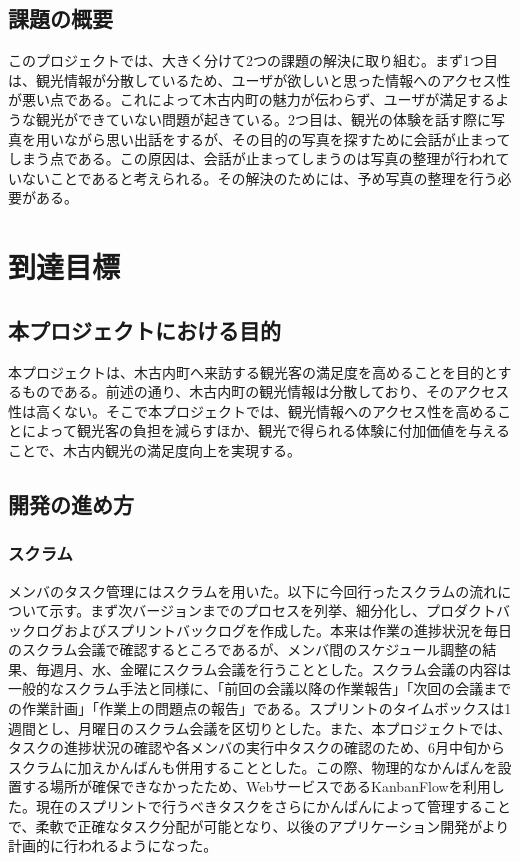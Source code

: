 \documentclass[openany,11pt,papersize]{jsbook}
\begin{document}
\section{課題の概要}\label{sec:gaiyou}
このプロジェクトでは、大きく分けて2つの課題の解決に取り組む。まず1つ目は、観光情報が分散しているため、ユーザが欲しいと思った情報へのアクセス性が悪い点である。これによって木古内町の魅力が伝わらず、ユーザが満足するような観光ができていない問題が起きている。2つ目は、観光の体験を話す際に写真を用いながら思い出話をするが、その目的の写真を探すために会話が止まってしまう点である。この原因は、会話が止まってしまうのは写真の整理が行われていないことであると考えられる。その解決のためには、予め写真の整理を行う必要がある。


\chapter{到達目標}
\section{本プロジェクトにおける目的}
本プロジェクトは、木古内町へ来訪する観光客の満足度を高めることを目的とするものである。前述の通り、木古内町の観光情報は分散しており、そのアクセス性は高くない。そこで本プロジェクトでは、観光情報へのアクセス性を高めることによって観光客の負担を減らすほか、観光で得られる体験に付加価値を与えることで、木古内観光の満足度向上を実現する。



\section{開発の進め方}
\subsection{スクラム}
メンバのタスク管理にはスクラムを用いた。以下に今回行ったスクラムの流れについて示す。まず次バージョンまでのプロセスを列挙、細分化し、プロダクトバックログおよびスプリントバックログを作成した。本来は作業の進捗状況を毎日のスクラム会議で確認するところであるが、メンバ間のスケジュール調整の結果、毎週月、水、金曜にスクラム会議を行うこととした。スクラム会議の内容は一般的なスクラム手法と同様に、「前回の会議以降の作業報告」「次回の会議までの作業計画」「作業上の問題点の報告」である。スプリントのタイムボックスは1週間とし、月曜日のスクラム会議を区切りとした。また、本プロジェクトでは、タスクの進捗状況の確認や各メンバの実行中タスクの確認のため、6月中旬からスクラムに加えかんばんも併用することとした。この際、物理的なかんばんを設置する場所が確保できなかったため、WebサービスであるKanbanFlowを利用した。現在のスプリントで行うべきタスクをさらにかんばんによって管理することで、柔軟で正確なタスク分配が可能となり、以後のアプリケーション開発がより計画的に行われるようになった。
\end{document}
